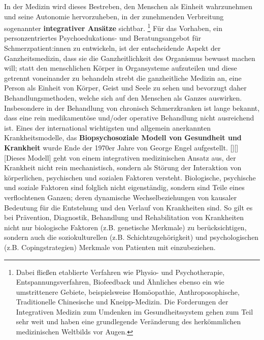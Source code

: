 \documentclass[
  twoside,
  parskip=half-,
  paper=176mm:246mm,
  BCOR=14mm,
  DIV=14,
]{scrreprt}
\makeatletter
\renewenvironment*{displayquote}
  {\begingroup\setlength{\leftmargini}{0pt}\csq@getcargs{\csq@bdquote{}{}}}
  {\csq@edquote\endgroup}
\makeatother
\begin{document}
In der Medizin wird dieses Bestreben, den Menschen als Einheit wahrzunehmen und seine Autonomie hervorzuheben, in der zunehmenden Verbreitung sogenannter \textbf{integrativer Ansätze} sichtbar. \footnote{Dabei fließen etablierte Verfahren wie Physio- und Psychotherapie, Entspannungsverfahren, Biofeedback und Ähnliches ebenso ein wie umstrittenere Gebiete, beispielsweise Homöopathie, Anthroposophische, Traditionelle Chinesische und Kneipp-Medizin.  Die Forderungen der Integrativen Medizin zum Umdenken im Gesundheitssystem gehen zum Teil sehr weit und haben eine grundlegende Veränderung des herkömmlichen medizinischen Weltbilds vor Augen.} Für das Vorhaben, ein personzentriertes Psychoedukations- und Beratungsangebot für Schmerzpatient:innen zu entwickeln, ist der entscheidende Aspekt der Ganzheitsmedizin, dass sie die Ganzheitlichkeit des Organismus bewusst machen will; statt den menschlichen Körper in Organsysteme aufzuteilen und diese getrennt voneinander zu behandeln strebt die ganzheitliche Medizin an, eine Person als Einheit von Körper, Geist und Seele zu sehen und bevorzugt daher Behandlungsmethoden, welche sich auf den Menschen als Ganzes auswirken.  Insbesondere in der Behandlung von chronisch Schmerzkranken ist lange bekannt, dass eine rein medikamentöse und/oder operative Behandlung nicht ausreichend ist.  Eines der international wichtigsten und allgemein anerkannten Krankheitsmodelle, das \textbf{Biopsychosoziale Modell von Gesundheit und Krankheit} wurde Ende der 1970er Jahre von George Engel aufgestellt.
\begin{displayquote}[{\cite{Biopsychosozial}}][]
  [Dieses Modell] geht von einem integrativen medizinischen Ansatz aus, der Krankheit nicht rein mechanistisch, sondern als Störung der Interaktion von körperlichen, psychischen und sozialen Faktoren versteht. Biologische, psychische und soziale Faktoren sind folglich nicht eigenständig, sondern sind Teile eines verflochtenen Ganzen;  deren dynamische Wechselbeziehungen von kausaler Bedeutung für die Entstehung und den Verlauf von Krankheiten sind. So gilt es bei Prävention, Diagnostik, Behandlung und Rehabilitation von Krankheiten nicht nur biologische Faktoren (z.B. genetische Merkmale) zu berücksichtigen, sondern auch die soziokulturellen (z.B. Schichtzugehörigkeit) und psychologischen (z.B. Copingstrategien) Merkmale von Patienten mit einzubeziehen.
\end{displayquote}
\end{document}
